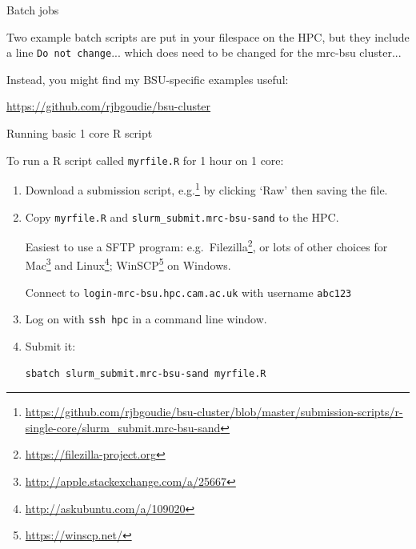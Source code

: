 \documentclass[t,10pt]{beamer}
\let\oldfootnote\footnote
\renewcommand\footnote[1][]{\oldfootnote[frame,#1]}
\begin{document}
\begin{frame}[fragile]{Batch jobs}

Two example batch scripts are put in your filespace on the HPC, but they include a line \texttt{Do not change}... which \alert{does need to be changed} for the mrc-bsu cluster...

\bigskip
Instead, you might find my BSU-specific examples useful:

\bigskip
\begin{centering}
\url{https://github.com/rjbgoudie/bsu-cluster}
\end{centering}

\end{frame}

\begin{frame}[fragile]{Running basic 1 core R script}

To run a R script called \texttt{myrfile.R} for 1 hour on 1 core:

\begin{enumerate}
\item Download  a submission script, e.g.\footnote{\url{https://github.com/rjbgoudie/bsu-cluster/blob/master/submission-scripts/r-single-core/slurm_submit.mrc-bsu-sand}} by clicking `Raw' then saving the file.

\item Copy \texttt{myrfile.R} and \texttt{slurm_submit.mrc-bsu-sand} to the HPC.

Easiest to use a SFTP program: e.g.\ Filezilla\footnote{\url{https://filezilla-project.org}}, or lots of other choices for Mac\footnote{\url{http://apple.stackexchange.com/a/25667}} and Linux\footnote{\url{http://askubuntu.com/a/109020}}; WinSCP\footnote{\url{https://winscp.net/}} on Windows.

Connect to \texttt{login-mrc-bsu.hpc.cam.ac.uk} with username \texttt{abc123}

\item Log on with \texttt{ssh hpc} in a command line window.

\item Submit it:
\begin{verbatim}
sbatch slurm_submit.mrc-bsu-sand myrfile.R
\end{verbatim}
\end{enumerate}
\end{frame}
\end{document}
